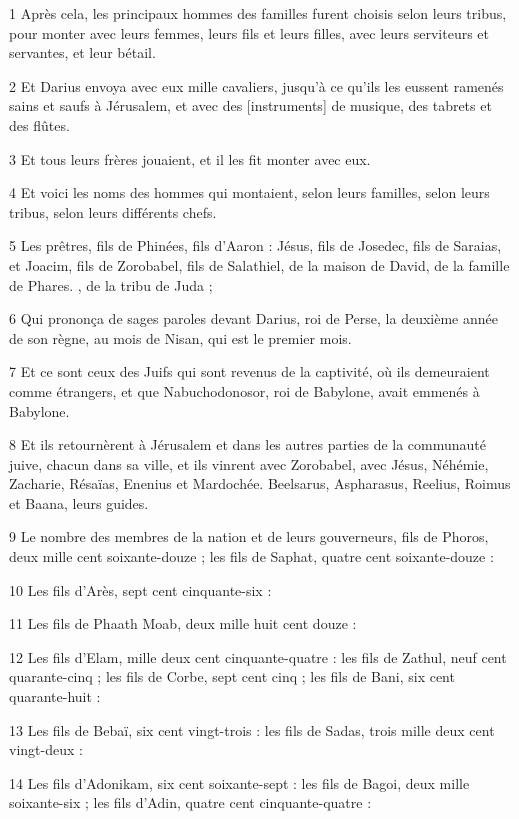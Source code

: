 \par 1 Après cela, les principaux hommes des familles furent choisis selon leurs tribus, pour monter avec leurs femmes, leurs fils et leurs filles, avec leurs serviteurs et servantes, et leur bétail.
\par 2 Et Darius envoya avec eux mille cavaliers, jusqu'à ce qu'ils les eussent ramenés sains et saufs à Jérusalem, et avec des [instruments] de musique, des tabrets et des flûtes.
\par 3 Et tous leurs frères jouaient, et il les fit monter avec eux.
\par 4 Et voici les noms des hommes qui montaient, selon leurs familles, selon leurs tribus, selon leurs différents chefs.
\par 5 Les prêtres, fils de Phinées, fils d'Aaron : Jésus, fils de Josedec, fils de Saraias, et Joacim, fils de Zorobabel, fils de Salathiel, de la maison de David, de la famille de Phares. , de la tribu de Juda ;
\par 6 Qui prononça de sages paroles devant Darius, roi de Perse, la deuxième année de son règne, au mois de Nisan, qui est le premier mois.
\par 7 Et ce sont ceux des Juifs qui sont revenus de la captivité, où ils demeuraient comme étrangers, et que Nabuchodonosor, roi de Babylone, avait emmenés à Babylone.
\par 8 Et ils retournèrent à Jérusalem et dans les autres parties de la communauté juive, chacun dans sa ville, et ils vinrent avec Zorobabel, avec Jésus, Néhémie, Zacharie, Résaïas, Enenius et Mardochée. Beelsarus, Aspharasus, Reelius, Roimus et Baana, leurs guides.
\par 9 Le nombre des membres de la nation et de leurs gouverneurs, fils de Phoros, deux mille cent soixante-douze ; les fils de Saphat, quatre cent soixante-douze :
\par 10 Les fils d'Arès, sept cent cinquante-six :
\par 11 Les fils de Phaath Moab, deux mille huit cent douze :
\par 12 Les fils d'Elam, mille deux cent cinquante-quatre : les fils de Zathul, neuf cent quarante-cinq ; les fils de Corbe, sept cent cinq ; les fils de Bani, six cent quarante-huit :
\par 13 Les fils de Bebaï, six cent vingt-trois : les fils de Sadas, trois mille deux cent vingt-deux :
\par 14 Les fils d'Adonikam, six cent soixante-sept : les fils de Bagoi, deux mille soixante-six ; les fils d'Adin, quatre cent cinquante-quatre :
